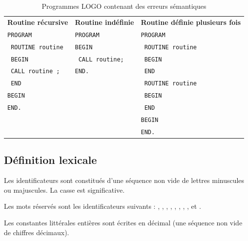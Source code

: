 \begin{table}[t]
  \centering
  \small
  \begin{tabular}{l|l|l}
  \textbf{Routine récursive}    &  \textbf{Routine indéfinie}    &  \textbf{Routine définie plusieurs fois} \\
  \texttt{PROGRAM}              &  \texttt{PROGRAM}              &  \texttt{PROGRAM}               \\
  \texttt{  ROUTINE routine}    &  \texttt{BEGIN}                &  \texttt{  ROUTINE routine}     \\
  \texttt{  BEGIN}              &  \texttt{  CALL routine;}      &  \texttt{  BEGIN}               \\
  \texttt{    CALL routine ;}   &  \texttt{END.}                 &  \texttt{  END}                 \\
  \texttt{  END}                &                                &  \texttt{  ROUTINE routine}     \\
  \texttt{BEGIN}                &                                &  \texttt{  BEGIN}               \\
  \texttt{END.}                 &                                &  \texttt{  END}                 \\
                                &                                &  \texttt{BEGIN}                 \\
                                &                                &  \texttt{END.}                  \\
  \end{tabular}
  \caption{Programmes LOGO contenant des erreurs sémantiques}
  \ligne
\end{table}


\subsection{Définition lexicale}

Les identificateurs sont constitués d'une séquence non vide de lettres minuscules ou majuscules. La casse est significative.

Les mots réservés sont les identificateurs suivants : , , , , , , , ,  et .

Les constantes littérales entières sont écrites en décimal (une séquence non vide de chiffres décimaux).

